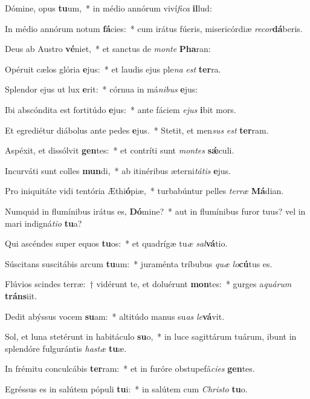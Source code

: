 \item Dómine, opus \textbf{tu}um,~* in médio annórum viví\textit{fi}\textit{ca} \textbf{il}lud:
\item In médio annórum notum \textbf{fá}cies:~* cum irátus fúeris, misericórdiæ \textit{re}\textit{cor}\textbf{dá}beris.
\item Deus ab Austro \textbf{vé}niet,~* et sanctus de \textit{mon}\textit{te} \textbf{Pha}ran:
\item Opéruit cælos glória \textbf{e}jus:~* et laudis ejus ple\textit{na} \textit{est} \textbf{ter}ra.
\item Splendor ejus ut lux \textbf{e}rit:~* córnua in má\textit{ni}\textit{bus} \textbf{e}jus:
\item Ibi abscóndita est fortitúdo \textbf{e}jus:~* ante fáciem \textit{e}\textit{jus} \textbf{i}bit mors.
\item Et egrediétur diábolus ante pedes \textbf{e}jus.~* Stetit, et men\textit{sus} \textit{est} \textbf{ter}ram.
\item Aspéxit, et dissólvit \textbf{gen}tes:~* et contríti sunt \textit{mon}\textit{tes} \textbf{sǽ}culi.
\item Incurváti sunt colles \textbf{mun}di,~* ab itinéribus æterni\textit{tá}\textit{tis} \textbf{e}jus.
\item Pro iniquitáte vidi tentória Æthi\textbf{ó}piæ,~* turbabúntur pelles \textit{ter}\textit{ræ} \textbf{Má}dian.
\item Numquid in flumínibus irátus es, \textbf{Dó}mine?~* aut in flumínibus furor tuus? vel in mari indigná\textit{ti}\textit{o} \textbf{tu}a?
\item Qui ascéndes super equos \textbf{tu}os:~* et quadrígæ tu\textit{æ} \textit{sal}\textbf{vá}tio.
\item Súscitans suscitábis arcum \textbf{tu}um:~* juraménta tríbubus \textit{quæ} \textit{lo}\textbf{cú}tus es.
\item Flúvios scindes terræ:~† vidérunt te, et doluérunt \textbf{mon}tes:~* gurges a\textit{quá}\textit{rum} \textbf{tráns}iit.
\item Dedit abýssus vocem \textbf{su}am:~* altitúdo manus su\textit{as} \textit{le}\textbf{vá}vit.
\item Sol, et luna stetérunt in habitáculo \textbf{su}o,~* in luce sagittárum tuárum, ibunt in splendóre fulgurántis \textit{has}\textit{tæ} \textbf{tu}æ.
\item In frémitu conculcábis \textbf{ter}ram:~* et in furóre obstupefá\textit{ci}\textit{es} \textbf{gen}tes.
\item Egréssus es in salútem pópuli \textbf{tu}i:~* in salútem cum \textit{Chris}\textit{to} \textbf{tu}o.
